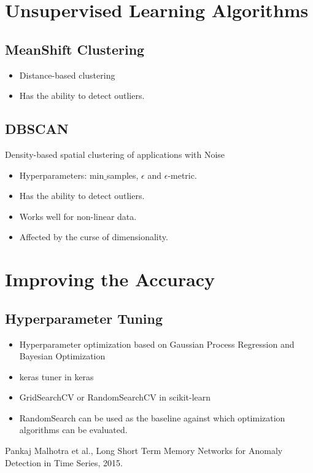 \documentclass[a4paper, 12pt]{report}
\begin{document}
\chapter{Unsupervised Learning Algorithms}

\section{MeanShift Clustering}
\begin{itemize}
\item Distance-based clustering
\item Has the ability to detect outliers.
\end{itemize}

\section{DBSCAN}
Density-based spatial clustering of applications with Noise
\begin{itemize}
\item Hyperparameters: min$\_$samples, $\epsilon$ and $\epsilon$-metric.
\item Has the ability to detect outliers.
\item Works well for non-linear data.
\item Affected by the curse of dimensionality.
\end{itemize}

\chapter{Improving the Accuracy}
\section{Hyperparameter Tuning}
\begin{itemize}
\item Hyperparameter optimization based on Gaussian Process Regression and Bayesian Optimization
\item keras tuner in keras
\item GridSearchCV or RandomSearchCV in scikit-learn
\item RandomSearch can be used as the baseline against which optimization algorithms can be evaluated.
\end{itemize}

\begin{thebibliography}{999}
	Pankaj Malhotra et al.,
	Long Short Term Memory Networks for Anomaly Detection in Time Series,
	2015.
\end{thebibliography}
\end{document}
